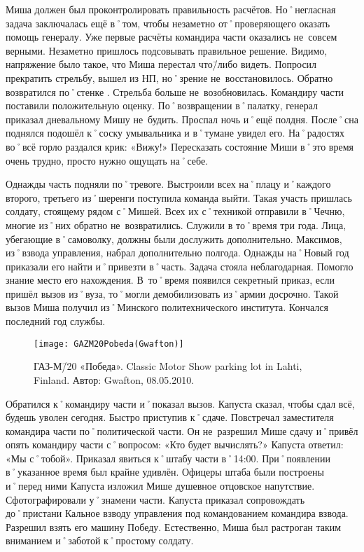 Миша должен был проконтролировать правильность расчётов. Но˚негласная задача заключалась ещё в˚том, чтобы незаметно от˚проверяющего оказать помощь генералу. Уже первые расчёты командира части оказались не~совсем верными. Незаметно пришлось подсовывать правильное решение. Видимо, напряжение было такое, что Миша перестал что\=/либо видеть. Попросил прекратить стрельбу, вышел из НП, но˚зрение не~восстановилось. Обратно возвратился по˚стенке . Стрельба больше не~возобновилась. Командиру части поставили положительную оценку. По˚возвращении в˚палатку, генерал приказал дневальному Мишу не~будить. Проспал ночь и˚ещё полдня. После˚сна поднялся подошёл к˚соску умывальника и в˚тумане увидел его. На˚радостях во˚всё горло раздался крик: «Вижу!» Пересказать состояние Миши в˚это время очень трудно, просто нужно ощущать на˚себе.

Однажды часть подняли по˚тревоге. Выстроили всех на˚плацу и˚каждого второго, третьего из˚шеренги поступила команда выйти. Такая участь пришлась солдату, стоящему рядом с˚Мишей. Всех их с˚техникой отправили в˚Чечню, многие из˚них обратно не~возвратились. Служили в то˚время три года. Лица, убегающие в˚самоволку, должны были дослужить дополнительно. Максимов, из˚взвода управления, набрал дополнительно полгода. Однажды на˚Новый год приказали его найти и˚привезти в˚часть. Задача стояла неблагодарная. Помогло знание место его нахождения. В~то˚время появился секретный приказ, если пришёл вызов из˚вуза, то˚могли демобилизовать из˚армии досрочно. Такой вызов Миша получил из˚Минского политехнического института. Кончался последний год службы.

\begin{wrapfigure}{O}{.4\textwidth}
\centering
\texttt{[image: GAZM20Pobeda(Gwafton)]}
\caption{ГАЗ-М\=/20 «Победа». \foreignlanguage{english}{Classic Motor Show parking lot in Lahti, Finland.} Автор: Gwafton, 08.05.2010.}
\label{fig:GAZM20Pobeda(Gwafton)}
\end{wrapfigure}

Обратился к˚командиру части и˚показал вызов. Капуста сказал, чтобы сдал всё, будешь уволен сегодня. Быстро приступив к˚сдаче. Повстречал заместителя командира части по˚политической части. Он не~разрешил Мише сдачу и˚привёл опять командиру части с˚вопросом: «Кто будет вычислять?» Капуста ответил: «Мы с˚тобой». Приказал явиться к˚штабу части в˚14:00. При˚появлении в˚указанное время был крайне удивлён. Офицеры штаба были построены и˚перед ними Капуста изложил Мише душевное отцовское напутствие. Сфотографировали у˚знамени части. Капуста приказал сопровождать до˚пристани Кальное взводу управления под командованием командира взвода. Разрешил взять его машину Победу. Естественно, Миша был растроган таким вниманием и˚заботой к˚простому солдату. 


